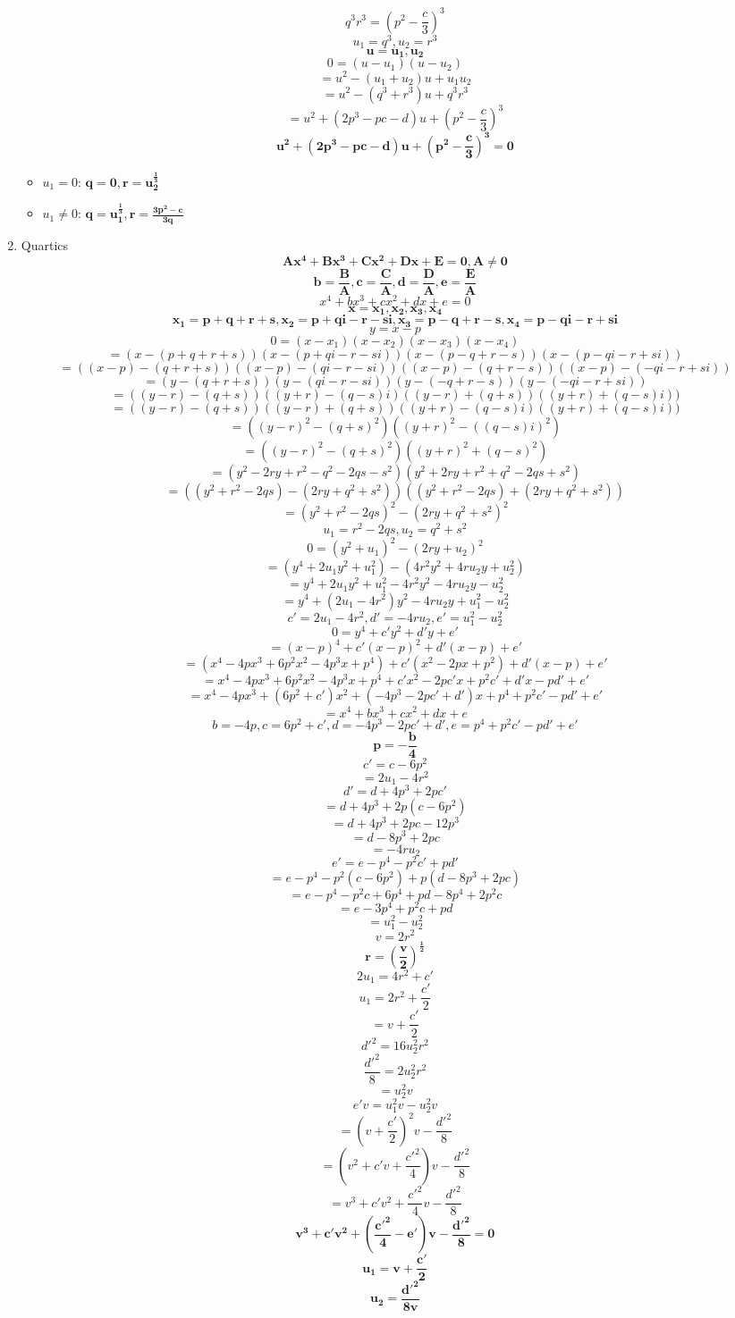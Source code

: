 \documentclass{article}
\begin{document}
\begin{enumerate}
  \[q^3r^3=(p^2-\frac{c}{3})^3\]
  \[u_1=q^3, u_2=r^3\]
  \[\bm{u=u_1, u_2}\]
  \[0=(u-u_1)(u-u_2)\]
  \[=u^2-(u_1+u_2)u+u_1u_2\]
  \[=u^2-(q^3+r^3)u+q^3r^3\]
  \[=u^2+(2p^3-pc-d)u+(p^2-\frac{c}{3})^3\]
  \[\bm{u^2+(2p^3-pc-d)u+(p^2-\frac{c}{3})^3=0}\]
  \begin{itemize}
  \item $u_1=0$: $\bm{q=0, r=u_2^\frac{1}{3}}$
  \item $u_1\neq0$: $\bm{q=u_1^\frac{1}{3}, r=\frac{3p^2-c}{3q}}$
  \end{itemize}
  \newpage
\item Quartics
  \[\bm{Ax^4+Bx^3+Cx^2+Dx+E=0, A\neq0}\]
  \[\bm{b=\frac{B}{A}, c=\frac{C}{A}, d=\frac{D}{A}, e=\frac{E}{A}}\]
  \[x^4+bx^3+cx^2+dx+e=0\]
  \[\bm{x=x_1,x_2,x_3,x_4}\]
  \[\bm{x_1=p+q+r+s, x_2=p+qi-r-si, x_3=p-q+r-s, x_4=p-qi-r+si}\]
  \[y=x-p\]
  \[0=(x-x_1)(x-x_2)(x-x_3)(x-x_4)\]
  \[=(x-(p+q+r+s))(x-(p+qi-r-si))(x-(p-q+r-s))(x-(p-qi-r+si))\]
  \[=((x-p)-(q+r+s))((x-p)-(qi-r-si))((x-p)-(q+r-s))((x-p)-(-qi-r+si))\]
  \[=(y-(q+r+s))(y-(qi-r-si))(y-(-q+r-s))(y-(-qi-r+si))\]
  \[=((y-r)-(q+s))((y+r)-(q-s)i)((y-r)+(q+s))((y+r)+(q-s)i))\]
  \[=((y-r)-(q+s))((y-r)+(q+s))((y+r)-(q-s)i)((y+r)+(q-s)i))\]
  \[=((y-r)^2-(q+s)^2)((y+r)^2-((q-s)i)^2)\]
  \[=((y-r)^2-(q+s)^2)((y+r)^2+(q-s)^2)\]
  \[=(y^2-2ry+r^2-q^2-2qs-s^2)(y^2+2ry+r^2+q^2-2qs+s^2)\]
  \[=((y^2+r^2-2qs)-(2ry+q^2+s^2))((y^2+r^2-2qs)+(2ry+q^2+s^2))\]
  \[=(y^2+r^2-2qs)^2-(2ry+q^2+s^2)^2\]
  \[u_1=r^2-2qs, u_2=q^2+s^2\]
  \[0=(y^2+u_1)^2-(2ry+u_2)^2\]
  \[=(y^4+2u_1y^2+u_1^2)-(4r^2y^2+4ru_2y+u_2^2)\]
  \[=y^4+2u_1y^2+u_1^2-4r^2y^2-4ru_2y-u_2^2\]
  \[=y^4+(2u_1-4r^2)y^2-4ru_2y+u_1^2-u_2^2\]
  \[c'=2u_1-4r^2, d'=-4ru_2, e'=u_1^2-u_2^2\]
  \[0=y^4+c'y^2+d'y+e'\]
  \[=(x-p)^4+c'(x-p)^2+d'(x-p)+e'\]
  \[=(x^4-4px^3+6p^2x^2-4p^3x+p^4)+c'(x^2-2px+p^2)+d'(x-p)+e'\]
  \[=x^4-4px^3+6p^2x^2-4p^3x+p^4+c'x^2-2pc'x+p^2c'+d'x-pd'+e'\]
  \[=x^4-4px^3+(6p^2+c')x^2+(-4p^3-2pc'+d')x+p^4+p^2c'-pd'+e'\]
  \[=x^4+bx^3+cx^2+dx+e\]
  \[b=-4p, c=6p^2+c', d=-4p^3-2pc'+d', e=p^4+p^2c'-pd'+e'\]
  \[\bm{p=-\frac{b}{4}}\]
  \[c'=c-6p^2\]
  \[=2u_1-4r^2\]
  \[d'=d+4p^3+2pc'\]
  \[=d+4p^3+2p(c-6p^2)\]
  \[=d+4p^3+2pc-12p^3\]
  \[=d-8p^3+2pc\]
  \[=-4ru_2\]
  \[e'=e-p^4-p^2c'+pd'\]
  \[=e-p^4-p^2(c-6p^2)+p(d-8p^3+2pc)\]
  \[=e-p^4-p^2c+6p^4+pd-8p^4+2p^2c\]
  \[=e-3p^4+p^2c+pd\]
  \[=u_1^2-u_2^2\]
  \[v=2r^2\]
  \[\bm{r=(\frac{v}{2})^\frac{1}{2}}\]
  \[2u_1=4r^2+c'\]
  \[u_1=2r^2+\frac{c'}{2}\]
  \[=v+\frac{c'}{2}\]
  \[d'^2=16u_2^2r^2\]
  \[\frac{d'^2}{8}=2u_2^2r^2\]
  \[=u_2^2v\]
  \[e'v=u_1^2v-u_2^2v\]
  \[=(v+\frac{c'}{2})^2v-\frac{d'^2}{8}\]
  \[=(v^2+c'v+\frac{c'^2}{4})v-\frac{d'^2}{8}\]
  \[=v^3+c'v^2+\frac{c'^2}{4}v-\frac{d'^2}{8}\]
  \[\bm{v^3+c'v^2+(\frac{c'^2}{4}-e')v-\frac{d'^2}{8}=0}\]
  \[\bm{u_1=v+\frac{c'}{2}}\]
  \[\bm{u_2=\frac{d'^2}{8v}}\]
\end{enumerate}
\end{document}
